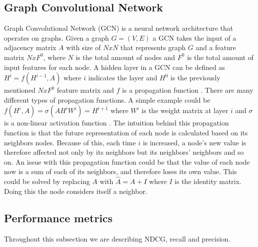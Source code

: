 \subsection{Graph Convolutional Network}
Graph Convolutional Network (GCN) is a neural network architecture that operates on graphs.
Given a graph $G = (V,E)$ a GCN takes the input of a adjacency
matrix $A$ with size of $N x N$ that represents graph $G$ and a feature matrix $N x F^0$, where $N$ is the total amount of nodes and $F^0$ is the total amount of input features for each node.
A hidden layer in a GCN can be defined as $H^i = f(H^{i-1}, A)$ where $i$ indicates the layer and $H^0$ is the previously mentioned $N x F^0$ feature matrix and $f$ is a propagation function \cite{Deep-Learning-on-Graphs-with-GCN}.
There are many different types of propagation functions.
A simple example could be $f(H^i, A) = \sigma(AH^iW^i) = H^{i+1}$ where $W^i$ is the weight matrix at layer $i$ and $\sigma$ is a non-linear activation function \cite{Deep-Learning-on-Graphs-with-GCN}.
The intuition behind this propagation function is that the future representation of each node is calculated based on its neighbors nodes.
Because of this, each time $i$ is increased, a node's new value is therefore affected not only by its neighbors but its neighbors' neighbors and so on.
An issue with this propagation function could be that the value of each node now is a sum of each of its neighbors, and therefore loses its own value.
This could be solved by replacing $A$ with $\hat{A} = A + I$ where $I$ is the identity matrix.
Doing this the node considers itself a neighbor.

\subsection{Performance metrics}
Throughout this subsection we are describing NDCG, recall and precision.

